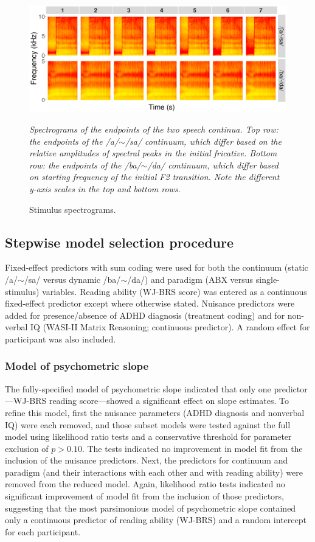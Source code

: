 \documentclass[..\uwthesis.tex]{subfiles}
\begin{document}
\begin{figure}
    \centering
    \caption{Stimulus spectrograms.}
    \label{fig:suppa_3}
    \includegraphics[width = 18 cm]{images/appendix_a/s3_spectrograms.png}
    \item \textit{Spectrograms of the endpoints of the two speech continua. Top row: the endpoints of the /a/$\sim$/sa/ continuum, which differ based on the relative amplitudes of spectral peaks in the initial fricative. Bottom row: the endpoints of the /ba/$\sim$/da/ continuum, which differ based on starting frequency of the initial F2 transition. Note the different y-axis scales in the top and bottom rows.}
\end{figure}

\subsection{Stepwise model selection procedure}
Fixed-effect predictors with sum coding were used for both the continuum (static /a/$\sim$/sa/ versus dynamic /ba/$\sim$/da/) and paradigm (ABX versus single-stimulus) variables. Reading ability (WJ-BRS score) was entered as a continuous fixed-effect predictor except where otherwise stated. Nuisance predictors were added for presence/absence of ADHD diagnosis (treatment coding) and for non-verbal IQ (WASI-II Matrix Reasoning; continuous predictor). A random effect for participant was also included.

\subsubsection{Model of psychometric slope}
The fully-specified model of psychometric slope indicated that only one predictor---WJ-BRS reading score---showed a significant effect on slope estimates. To refine this model, first the nuisance parameters (ADHD diagnosis and nonverbal IQ) were each removed, and those subset models were tested against the full model using likelihood ratio tests and a conservative threshold for parameter exclusion of $p > 0.10$. The tests indicated no improvement in model fit from the inclusion of the nuisance predictors. Next, the predictors for continuum and paradigm (and their interactions with each other and with reading ability) were removed from the reduced model. Again, likelihood ratio tests indicated no significant improvement of model fit from the inclusion of those predictors, suggesting that the most parsimonious model of psychometric slope contained only a continuous predictor of reading ability (WJ-BRS) and a random intercept for each participant.
\end{document}
